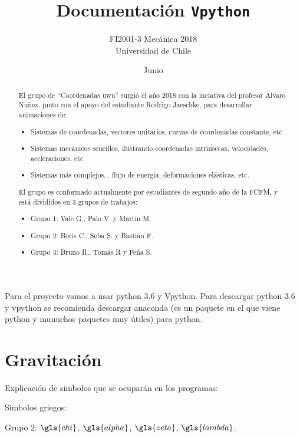 \documentclass[letterpaper,12pt]{article}
\title{\Huge\bfseries Documentación \texttt{Vpython}}
\author{\Large FI2001-3 Mecánica 2018\\ Universidad de Chile}
\date{Junio}
\begin{document}
\pagestyle{empty}
\maketitle
\begin{abstract}
El grupo de ``Coordenadas uwu'' surgió el año 2018 con la inciativa del profesor Alvaro Nuñez, junto con el apoyo del estudiante Rodrigo Jaeschke, para desarrollar animaciones de:
\begin{itemize}
\item Sistemas de coordenadas, vectores unitarios, curvas de coordenadas constante, etc
\item Sistemas mecánicos sencillos, ilustrando coordenadas intrinsecas, velocidades, aceleraciones, etc
\item Sistemas más complejos... flujo de energía, deformaciones elásticas, etc. 
\end{itemize}
El grupo es conformado actualmente por estudiantes de segundo año de la FCFM, y está divididos en 3 grupos de trabajos:
\begin{itemize}
	\item Grupo 1: Vale G., Palo V. y Martin M.
	\item Grupo 2: Boris C., Seba S. y Bastián F.
	\item Grupo 3: Bruno R., Tomás R y Feña S.
\end{itemize}
\end{abstract}
\thispagestyle{empty} %

\newpage
\thispagestyle{empty}
\tableofcontents
\listoftables
\listoffigures
\printunsrtglossary[type=symbols,style=alttreegroup,title={Lista de simbolos}]
\newpage
Para el proyecto vamos a usar python 3.6 y Vpython. Para descargar python 3.6 y vpython se recomienda descargar anaconda (es un paquete en el que viene python y muuuchos paquetes muy útiles) para python. 

\section{Gravitación}
Explicación de simbolos que se ocuparán en los programas:

Simbolos griegos: 
 
Grupo 2: $\gls{chi}$, $\gls{alpha}$, $\gls{zeta}$, $\gls{lambda}$.
\end{document}
